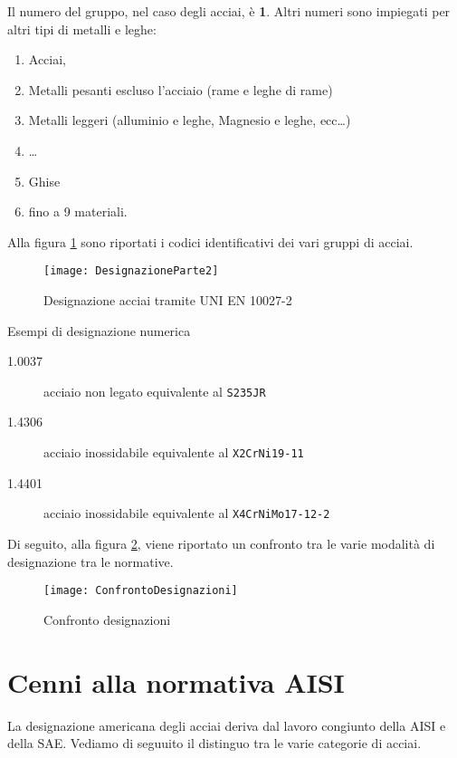Il numero del gruppo, nel caso degli acciai, è \textbf{1}. Altri numeri sono impiegati per altri tipi di metalli e leghe:

\begin{enumerate}
\item Acciai,
\item Metalli pesanti escluso l'acciaio (rame e leghe di rame)
\item Metalli leggeri (alluminio e leghe, Magnesio e leghe, ecc\dots)
\item \dots
\item Ghise
\item fino a 9 materiali.
\end{enumerate}

Alla figura \ref{fig:UNIEN10027-2} sono riportati i codici identificativi dei vari gruppi di acciai.

\begin{figure}
\centering
\texttt{[image: DesignazioneParte2]}
\caption{Designazione acciai tramite UNI EN 10027-2}
\label{fig:UNIEN10027-2}
\end{figure}

\begin{example}{Esempi di designazione numerica}
\begin{description}
\item[1.0037] acciaio non legato equivalente al \texttt{S235JR}
\item[1.4306] acciaio inossidabile equivalente al \texttt{X2CrNi19-11}
\item[1.4401] acciaio inossidabile equivalente al \texttt{X4CrNiMo17-12-2}
\end{description}
\end{example}

Di seguito, alla figura \ref{fig:ConfDes}, viene riportato un confronto tra le varie modalità di designazione tra le normative.

\begin{figure}
\centering
\texttt{[image: ConfrontoDesignazioni]}
\caption{Confronto designazioni}\label{fig:ConfDes}
\end{figure}

\section{Cenni alla normativa AISI}\label{sc:AISI}
La designazione americana degli acciai deriva dal lavoro congiunto della \ac{AISI} e della \ac{SAE}.
Vediamo di seguuito il distinguo tra le varie categorie di acciai.

